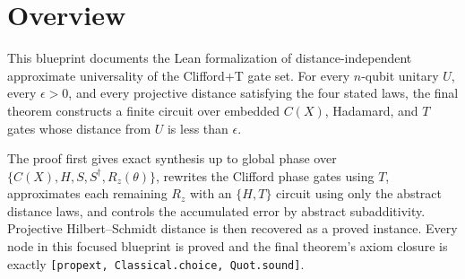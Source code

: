 \section{Overview}

This blueprint documents the Lean formalization of distance-independent
approximate universality of the Clifford+T gate set.  For every $n$-qubit
unitary $U$, every $\epsilon>0$, and every projective distance satisfying the
four stated laws, the final theorem constructs a finite circuit over embedded
$C(X)$, Hadamard, and $T$ gates whose distance from $U$ is less than
$\epsilon$.

The proof first gives exact synthesis up to global phase over
$\{C(X),H,S,S^\dagger,R_z(\theta)\}$, rewrites the Clifford phase gates using
$T$, approximates each remaining $R_z$ with an $\{H,T\}$ circuit using only
the abstract distance laws, and controls the accumulated error by abstract
subadditivity.  Projective Hilbert--Schmidt distance is then recovered as a
proved instance.  Every node in this focused blueprint is proved and the
final theorem's axiom closure is exactly
\texttt{[propext, Classical.choice, Quot.sound]}.
